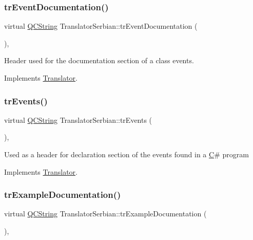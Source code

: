 \subsubsection{\texorpdfstring{trEventDocumentation()}{trEventDocumentation()}}
{\footnotesize\ttfamily virtual \mbox{\hyperlink{class_q_c_string}{Q\+C\+String}} Translator\+Serbian\+::tr\+Event\+Documentation (\begin{DoxyParamCaption}{ }\end{DoxyParamCaption})\hspace{0.3cm}{\ttfamily [inline]}, {\ttfamily [virtual]}}

Header used for the documentation section of a class\textquotesingle{} events. 

Implements \mbox{\hyperlink{class_translator}{Translator}}.

\mbox{\label{class_translator_serbian_a96cbd637a8231ac9456eb278a3822a1e}} 
\subsubsection{\texorpdfstring{trEvents()}{trEvents()}}
{\footnotesize\ttfamily virtual \mbox{\hyperlink{class_q_c_string}{Q\+C\+String}} Translator\+Serbian\+::tr\+Events (\begin{DoxyParamCaption}{ }\end{DoxyParamCaption})\hspace{0.3cm}{\ttfamily [inline]}, {\ttfamily [virtual]}}

Used as a header for declaration section of the events found in a \mbox{\hyperlink{class_c}{C}}\# program 

Implements \mbox{\hyperlink{class_translator}{Translator}}.

\mbox{\label{class_translator_serbian_abacc757e76d020434c2c23c6ac07fbb9}} 
\subsubsection{\texorpdfstring{trExampleDocumentation()}{trExampleDocumentation()}}
{\footnotesize\ttfamily virtual \mbox{\hyperlink{class_q_c_string}{Q\+C\+String}} Translator\+Serbian\+::tr\+Example\+Documentation (\begin{DoxyParamCaption}{ }\end{DoxyParamCaption})\hspace{0.3cm}{\ttfamily [inline]}, {\ttfamily [virtual]}}

